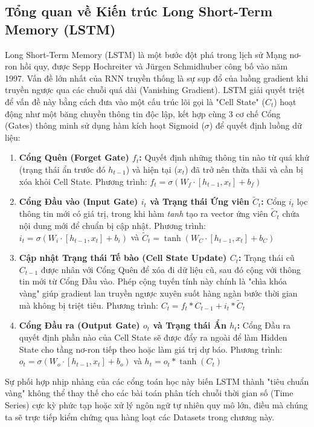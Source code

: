 \subsection{Tổng quan về Kiến trúc Long Short-Term Memory (LSTM)}
Long Short-Term Memory (LSTM) là một bước đột phá trong lịch sử Mạng nơ-ron hồi quy, được Sepp Hochreiter và Jürgen Schmidhuber công bố vào năm 1997. Vấn đề lớn nhất của RNN truyền thống là sự sụp đổ của luồng gradient khi truyền ngược qua các chuỗi quá dài (Vanishing Gradient). LSTM giải quyết triệt để vấn đề này bằng cách đưa vào một cấu trúc lõi gọi là "Cell State" ($C_t$) hoạt động như một băng chuyền thông tin độc lập, kết hợp cùng 3 cơ chế Cổng (Gates) thông minh sử dụng hàm kích hoạt Sigmoid ($\sigma$) để quyết định luồng dữ liệu:

\begin{enumerate}
    \item \textbf{Cổng Quên (Forget Gate) $f_t$:} Quyết định những thông tin nào từ quá khứ (trạng thái ẩn trước đó $h_{t-1}$) và hiện tại ($x_t$) đã trở nên thừa thãi và cần bị xóa khỏi Cell State. 
    Phương trình: $f_t = \sigma(W_f \cdot [h_{t-1}, x_t] + b_f)$
    
    \item \textbf{Cổng Đầu vào (Input Gate) $i_t$ và Trạng thái Ứng viên $\tilde{C}_t$:} Cổng $i_t$ lọc thông tin mới có giá trị, trong khi hàm \textit{tanh} tạo ra vector ứng viên $\tilde{C}_t$ chứa nội dung mới để chuẩn bị cập nhật.
    Phương trình: $i_t = \sigma(W_i \cdot [h_{t-1}, x_t] + b_i)$ và $\tilde{C}_t = \tanh(W_C \cdot [h_{t-1}, x_t] + b_C)$
    
    \item \textbf{Cập nhật Trạng thái Tế bào (Cell State Update) $C_t$:} Trạng thái cũ $C_{t-1}$ được nhân với Cổng Quên để xóa đi dữ liệu cũ, sau đó cộng với thông tin mới từ Cổng Đầu vào. Phép cộng tuyến tính này chính là "chìa khóa vàng" giúp gradient lan truyền ngược xuyên suốt hàng ngàn bước thời gian mà không bị triệt tiêu.
    Phương trình: $C_t = f_t * C_{t-1} + i_t * \tilde{C}_t$
    
    \item \textbf{Cổng Đầu ra (Output Gate) $o_t$ và Trạng thái Ẩn $h_t$:} Cổng Đầu ra quyết định phần nào của Cell State sẽ được đẩy ra ngoài để làm Hidden State cho tầng nơ-ron tiếp theo hoặc làm giá trị dự báo.
    Phương trình: $o_t = \sigma(W_o \cdot [h_{t-1}, x_t] + b_o)$ và $h_t = o_t * \tanh(C_t)$
\end{enumerate}

Sự phối hợp nhịp nhàng của các cổng toán học này biến LSTM thành "tiêu chuẩn vàng" không thể thay thế cho các bài toán phân tích chuỗi thời gian số (Time Series) cực kỳ phức tạp hoặc xử lý ngôn ngữ tự nhiên quy mô lớn, điều mà chúng ta sẽ trực tiếp kiểm chứng qua hàng loạt các Datasets trong chương này.

